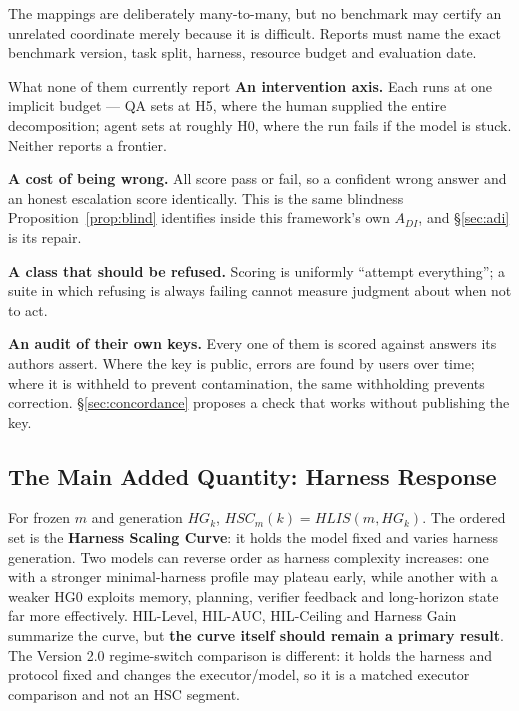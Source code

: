 \documentclass[11pt]{article}
\theoremstyle{definition}
\begin{document}
The mappings are deliberately many-to-many, but no benchmark may certify an unrelated coordinate merely because it is difficult. Reports must name the exact benchmark version, task split, harness, resource budget and evaluation date.

\begin{claimbox}{What none of them currently report}
\textbf{An intervention axis.} Each runs at one implicit budget --- QA sets at H5, where the human supplied the entire decomposition; agent sets at roughly H0, where the run fails if the model is stuck. Neither reports a frontier.

\textbf{A cost of being wrong.} All score pass or fail, so a confident wrong answer and an honest escalation score identically. This is the same blindness Proposition~\ref{prop:blind} identifies inside this framework's own $A_{DI}$, and \S\ref{sec:adi} is its repair.

\textbf{A class that should be refused.} Scoring is uniformly ``attempt everything''; a suite in which refusing is always failing cannot measure judgment about when not to act.

\textbf{An audit of their own keys.} Every one of them is scored against answers its authors assert. Where the key is public, errors are found by users over time; where it is withheld to prevent contamination, the same withholding prevents correction. \S\ref{sec:concordance} proposes a check that works without publishing the key.
\end{claimbox}

\subsection{The Main Added Quantity: Harness Response}

For frozen $m$ and generation $HG_k$, $HSC_m(k) = HLIS(m,HG_k)$. The ordered set is the \textbf{Harness Scaling Curve}: it holds the model fixed and varies harness generation. Two models can reverse order as harness complexity increases: one with a stronger minimal-harness profile may plateau early, while another with a weaker HG0 exploits memory, planning, verifier feedback and long-horizon state far more effectively. HIL-Level, HIL-AUC, HIL-Ceiling and Harness Gain summarize the curve, but \textbf{the curve itself should remain a primary result}. The Version 2.0 regime-switch comparison is different: it holds the harness and protocol fixed and changes the executor/model, so it is a matched executor comparison and not an HSC segment.
\end{document}
